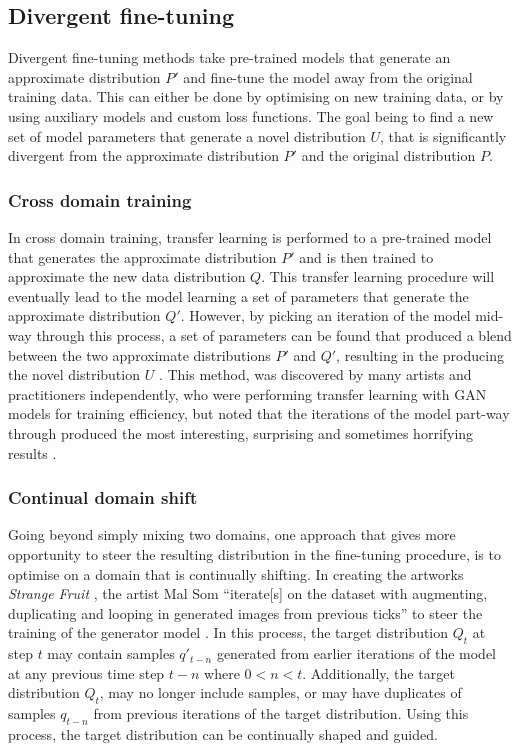 \subsection{Divergent fine-tuning}
\label{survey:divergent}

Divergent fine-tuning methods take pre-trained models that generate an approximate distribution $P'$ and fine-tune the model away from the original training data. 
This can either be done by optimising on new training data, or by using auxiliary models and custom loss functions. 
The goal being to find a new set of model parameters that generate a novel distribution $U$, that is significantly divergent from the approximate distribution $P'$ and the original distribution $P$.

\subsubsection{Cross domain training} 

In cross domain training, transfer learning is performed to a pre-trained model that generates the approximate distribution $P'$ and is then trained to approximate the new data distribution $Q$. 
This transfer learning procedure will eventually lead to the model learning a set of parameters that generate the approximate distribution $Q'$. 
However, by picking an iteration of the model mid-way through this process, a set of parameters can be found that produced a blend between the two approximate distributions $P'$ and $Q'$, resulting in the producing the novel distribution $U$ \citep{schultz2020mixed}. 
This method, was discovered by many artists and practitioners independently, who were performing transfer learning with GAN models for training efficiency, but noted that the iterations of the model part-way through produced the most interesting, surprising and sometimes horrifying results \citep{adler2020transfer,black2020noface,mariansky2020transfer,shane2020cat}.

\subsubsection{Continual domain shift}
\label{section:domainshift}

Going beyond simply mixing two domains, one approach that gives more opportunity to steer the resulting distribution in the fine-tuning procedure, is to optimise on a domain that is continually shifting. In creating the artworks \textit{Strange Fruit} \citep{som2020strange}, the artist Mal Som ``iterate[s] on the dataset with augmenting, duplicating and looping in generated images from previous ticks'' to steer the training of the generator model \citep{som2021personal}. 
In this process, the target distribution $Q_t$ at step $t$ may contain samples $q'_{t-n}$ generated from earlier iterations of the model at any previous time step $t-n$ where $0<n<t$. 
Additionally, the target distribution $Q_t$, may no longer include samples, or may have duplicates of samples $q_{t-n}$ from previous iterations of the target distribution. 
Using this process, the target distribution can be continually shaped and guided. 

